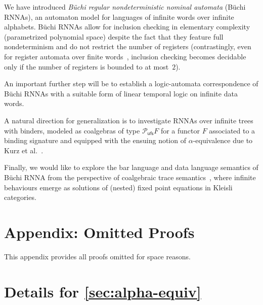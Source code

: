 \documentclass[final,a4paper,UKenglish,thm-restate,autoref,numberwithinsect]{lipics-v2021}
\numberwithin{equation}{section}
\newcommand{\+}[1]{\mathcal{#1}\xspace}
\newcommand{\Pow}{\mathcal{P}}
\newcommand{\ufs}{{\mathsf{ufs}}}
\theoremstyle{definition}
\begin{document}
\noindent We have introduced \emph{B\"uchi regular nondeterministic
  nominal automata} (B\"uchi RNNAs), an automaton model for languages
of infinite words over infinite alphabets. B\"uchi RNNAs allow for
inclusion checking in elementary complexity (parametrized
polynomial space) despite the fact that they feature full
nondeterminism and do not restrict the number of registers
(contrastingly, even for register automata over finite
words~\cite{KaminskiFrancez94}, inclusion checking becomes decidable
only if the number of registers is bounded to at most~$2$).

 An
important further step will be to establish a logic-automata
correspondence of B\"uchi RNNAs with a suitable form of linear
temporal logic on infinite data words.

A natural direction for generalization is to investigate RNNAs over infinite trees with binders, modeled as coalgebras of type $\Pow_\ufs F$ for a functor $F$ associated to a binding signature and equipped with the ensuing notion of $\alpha$-equivalence due to Kurz et al.~\cite{kpsv13}. 

Finally, we would like to explore the bar language and data language semantics of Büchi RNNA from the perspective of coalgebraic trace semantics~\cite{ush16}, where infinite behaviours emerge as solutions of (nested) fixed point equations in Kleisli categories.




\clearpage
\appendix

\section*{Appendix: Omitted Proofs}
This appendix provides all proofs omitted for space reasons.

\section{Details for \autoref{sec:alpha-equiv}}
\end{document}
